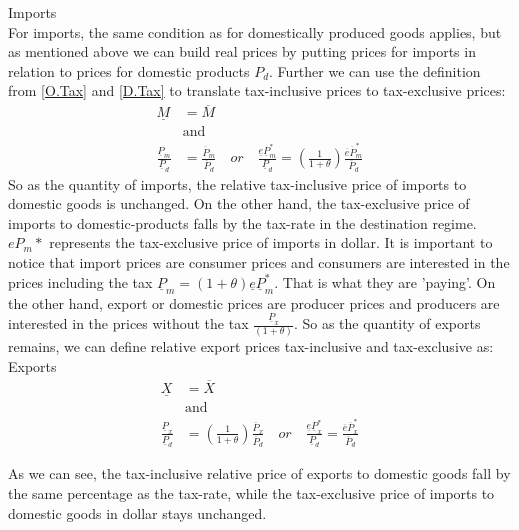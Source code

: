 \noindent Imports \\
For imports, the same condition as for domestically produced goods applies, but as mentioned above we can build real prices by putting prices for imports in relation to prices for domestic products $P_d$. Further we can use the definition from \eqref{O.Tax} and \eqref{D.Tax} to translate tax-inclusive prices to tax-exclusive prices: 
\begin{equation}\label{P.M}
\begin{aligned}
\underline M &= \overline M \\
&\text{and}\\
\frac{\underline P_m}{\underline P_d} &= \frac{\overline P_m}{\overline P_d} \quad or \quad \frac{\underline e \underline P_m^*}{\underline P_d} =  \left( \frac{1}{1+\theta} \right) \frac{\overline e \overline P^*_m}{\overline P_d}
\end{aligned}
\end{equation}
So as the quantity of imports, the relative tax-inclusive price of imports to domestic goods is unchanged. On the other hand, the tax-exclusive price of imports to domestic-products falls by the tax-rate in the destination regime. $e P_m*$ represents the tax-exclusive price of imports in dollar. 
It is important to notice that import prices are consumer prices and consumers are interested in the prices including the tax $\underline P_m = \left( 1+\theta \right) \underline e \underline P^*_m$. That is what they are  'paying'. On the other hand, export or domestic prices are producer prices and producers are interested in the prices without the tax $\frac{\underline P_x}{ \left( 1+\theta \right) }$. So as the quantity of exports remains, we can define relative export prices tax-inclusive and tax-exclusive as: \\
\noindent Exports
\begin{equation}\label{P.X}
\begin{aligned}
\underline X &= \overline X \\ &\text{and}\\ \frac{\underline P_x}{\underline P_d} &=  \left( \frac{1}{1+\theta} \right) \frac{\overline P_x}{\overline P_d} \quad or \quad \frac{\underline e \underline P_x^*}{\underline P_d} = \frac{\overline e \overline P^*_x}{\overline P_d}
\end{aligned}
\end{equation}

As we can see, the tax-inclusive relative price of exports to domestic goods fall by the same percentage as the tax-rate, while the tax-exclusive price of imports to domestic goods in dollar stays unchanged. 

